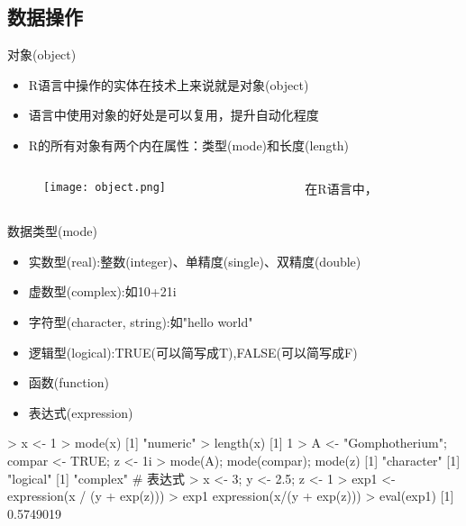 \subsection{数据操作}
\begin{frame}[t]{\subsecname}{对象(object)}
  \begin{itemize}
  \item R语言中操作的实体在技术上来说就是对象(object) 
  \item 语言中使用对象的好处是可以复用，提升自动化程度
  \item R的所有对象有两个内在属性：类型(mode)和长度(length)
  \end{itemize}

  \begin{columns}
    \begin{column}{.5\textwidth}
      \begin{figure}
        \centering \texttt{[image: object.png]}
      \end{figure}
    \end{column}

    \begin{column}{.48\textwidth}
      \begin{ornamentblock}
        \centering
        {在R语言中，}
      \end{ornamentblock}
    \end{column}
  \end{columns}
\end{frame}

\begin{frame}[t, fragile]{\subsecname}{数据类型(mode)}
  \begin{itemize}
  \item 实数型(real):整数(integer)、单精度(single)、双精度(double)
  \item 虚数型(complex):如10+21i
  \item 字符型(character, string):如"hello world"
  \item 逻辑型(logical):TRUE(可以简写成T),FALSE(可以简写成F)
  \item 函数(function)
  \item 表达式(expression)
  \end{itemize}

\begin{overlayarea}{\textwidth}{\textheight}
\begin{rcode}
> x <- 1
> mode(x)
[1] "numeric"
> length(x)
[1] 1
> A <- "Gomphotherium"; compar <- TRUE; z <- 1i
> mode(A); mode(compar); mode(z)
[1] "character"
[1] "logical"
[1] "complex"
# 表达式
> x <- 3; y <- 2.5; z <- 1
> exp1 <- expression(x / (y + exp(z)))
> exp1
expression(x/(y + exp(z)))
> eval(exp1)
[1] 0.5749019
\end{rcode}
\end{overlayarea}
\end{frame}

